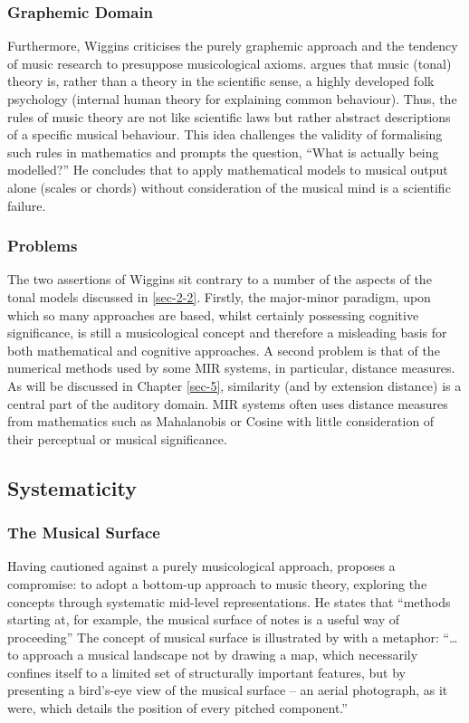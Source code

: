 \documentclass{article}
\begin{document}
\subsubsection{Graphemic Domain}
\label{sec-2-3-2}

Furthermore, Wiggins criticises the purely graphemic approach and the
tendency of music research to presuppose musicological
axioms. \citet{Wiggins2012} argues that music (tonal) theory is,
rather than a theory in the scientific sense, a highly developed folk
psychology (internal human theory for explaining common
behaviour). Thus, the rules of music theory are not like scientific
laws but rather abstract descriptions of a specific musical
behaviour. This idea challenges the validity of formalising such rules
in mathematics and prompts the question, ``What is actually being
modelled?'' He concludes that to apply mathematical models to musical
output alone (scales or chords) without consideration of the musical
mind is a scientific failure.
\subsubsection{Problems}
\label{sec-2-3-3}

The two assertions of Wiggins sit contrary to a number of the aspects
of the tonal models discussed in \ref{sec-2-2}. Firstly, the
major-minor paradigm, upon which so many approaches are based, whilst
certainly possessing cognitive significance, is still a musicological
concept and therefore a misleading basis for both mathematical and
cognitive approaches. A second problem is that of the numerical
methods used by some MIR systems, in particular, distance measures. As
will be discussed in Chapter \ref{sec-5}, similarity
(and by extension distance) is a central part of the auditory
domain. MIR systems often uses distance measures from mathematics such
as Mahalanobis \citep{Tzanetakis1999} or Cosine \citep{Foote2000} with
little consideration of their perceptual or musical significance.
\subsection{Systematicity}
\label{sec-2-4}
\subsubsection{The Musical Surface}
\label{sec-2-4-1}

Having cautioned against a purely musicological approach,
\citet[pp. 481]{Wiggins2009} proposes a compromise: to adopt a
bottom-up approach to music theory, exploring the concepts through
systematic mid-level representations. He states that ``methods
starting at, for example, the musical surface of notes is a useful way
of proceeding'' The concept of musical surface is illustrated by
\citet[pp. 159]{Huovinen2007} with a metaphor: ``\ldots{}to approach a
musical landscape not by drawing a map, which necessarily confines
itself to a limited set of structurally important features, but by
presenting a bird’s-eye view of the musical surface – an aerial
photograph, as it were, which details the position of every pitched
component.''
\end{document}
